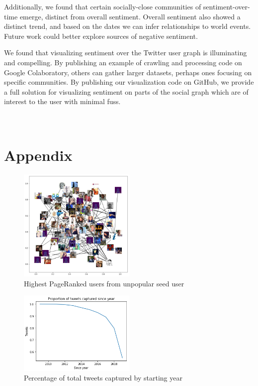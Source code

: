 \documentclass[11pt]{article}
\begin{document}
Additionally, we found that certain socially-close communities of sentiment-over-time emerge, distinct from overall sentiment. Overall sentiment also showed a distinct trend, and based on the dates we can infer relationships to world events. Future work could better explore sources of negative sentiment.\newline

We found that visualizing sentiment over the Twitter user graph is illuminating and compelling. By publishing an example of crawling and processing code on Google Colaboratory, others can gather larger datasets, perhaps ones focusing on specific communities. By publishing our visualization code on GitHub, we provide a full solution for visualizing sentiment on parts of the social graph which are of interest to the user with minimal fuss.

\appendix
\section{\\Appendix}

\begin{figure}[h!]
    \centering
     \includegraphics[width=0.5\textwidth]{nxgraph_unpopular_seed}
        \caption{Highest PageRanked users from unpopular seed user}
\end{figure}

\begin{figure}[h!]
    \centering
     \includegraphics[width=0.5\textwidth]{tweets_since_year}
        \caption{Percentage of total tweets captured by starting year}
\end{figure}
\end{document}
